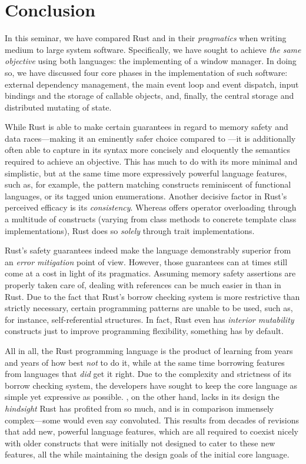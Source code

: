 \section{Conclusion}

In this seminar, we have compared Rust and \cpp in their \textit{pragmatics}
when writing medium to large system software. Specifically, we have sought to
achieve \textit{the same objective} using both languages: the implementing
of a window manager. In doing so, we have discussed four core phases in the
implementation of such software: external dependency management, the main event
loop and event dispatch, input bindings and the storage of callable objects,
and, finally, the central storage and distributed mutating of state.

While Rust is able to make certain guarantees in regard to memory safety and
data races---making it an eminently safer choice compared to \cpp---it is
additionally often able to capture in its syntax more concisely and eloquently
the semantics required to achieve an objective. This has much to do with its
more minimal and simplistic, but at the same time more expressively powerful
language features, such as, for example, the pattern matching constructs
reminiscent of functional languages, or its tagged union enumerations. Another
decisive factor in Rust's perceived efficacy is its \textit{consistency}.
Whereas \cpp offers operator overloading through a multitude of constructs
(varying from class methods to concrete template class implementations), Rust
does so \textit{solely} through trait implementations.

Rust's safety guarantees indeed make the language demonstrably superior from
an \textit{error mitigation} point of view. However, those guarantees can at
times still come at a cost in light of its pragmatics. Assuming memory safety
assertions are properly taken care of, dealing with references can be much
easier in \cpp than in Rust. Due to the fact that Rust's borrow checking system
is more restrictive than strictly necessary, certain programming patterns are
unable to be used, such as, for instance, self-referential structures. In
fact, Rust even has \textit{interior mutability} constructs just to improve
programming flexibility, something \cpp has by default.

All in all, the Rust programming language is the product of learning from years
and years of how best \textit{not} to do it, while at the same time borrowing
features from languages that \textit{did} get it right. Due to the complexity
and strictness of its borrow checking system, the developers have sought to
keep the core language as simple yet expressive as possible. \cpp, on the other
hand, lacks in its design the \textit{hindsight} Rust has profited from so much,
and is in comparison immensely complex---some would even say convoluted. This
results from decades of revisions that add new, powerful language features,
which are all required to coexist nicely with older constructs that were
initially not designed to cater to these new features, all the while maintaining
the design goals of the initial core language.
